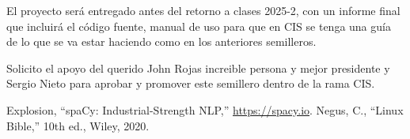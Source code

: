 \documentclass[conference, a4paper]{IEEEtran}
\begin{document}
El proyecto será entregado antes del retorno a clases 2025-2, con un informe final que incluirá el código fuente, manual de uso para que en CIS se
tenga una guía de lo que se va estar haciendo como en los anteriores semilleros.

Solicito el apoyo del querido John Rojas increible persona y mejor presidente y Sergio Nieto para aprobar y promover este semillero dentro de la rama
CIS.

\begin{thebibliography}{1}
 Explosion, ``spaCy: Industrial-Strength NLP,'' \url{https://spacy.io}.
 Negus, C., ``Linux Bible,'' 10th ed., Wiley, 2020.
\end{thebibliography}
\end{document}
